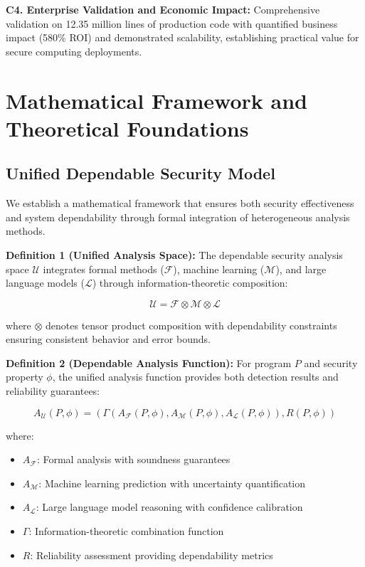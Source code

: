 \documentclass[10pt,journal,compsoc]{IEEEtran}
\begin{document}
\textbf{C4. Enterprise Validation and Economic Impact:} Comprehensive validation on 12.35 million lines of production code with quantified business impact (580\% ROI) and demonstrated scalability, establishing practical value for secure computing deployments.

\section{Mathematical Framework and Theoretical Foundations}

\subsection{Unified Dependable Security Model}

We establish a mathematical framework that ensures both security effectiveness and system dependability through formal integration of heterogeneous analysis methods.

\textbf{Definition 1 (Unified Analysis Space):} The dependable security analysis space $\mathcal{U}$ integrates formal methods ($\mathcal{F}$), machine learning ($\mathcal{M}$), and large language models ($\mathcal{L}$) through information-theoretic composition:

\begin{equation}
\mathcal{U} = \mathcal{F} \otimes \mathcal{M} \otimes \mathcal{L}
\end{equation}

where $\otimes$ denotes tensor product composition with dependability constraints ensuring consistent behavior and error bounds.

\textbf{Definition 2 (Dependable Analysis Function):} For program $P$ and security property $\phi$, the unified analysis function provides both detection results and reliability guarantees:

\begin{equation}
A_{\mathcal{U}}(P, \phi) = (\Gamma(A_{\mathcal{F}}(P, \phi), A_{\mathcal{M}}(P, \phi), A_{\mathcal{L}}(P, \phi)), R(P, \phi))
\end{equation}

where:
\begin{itemize}
\item $A_{\mathcal{F}}$: Formal analysis with soundness guarantees
\item $A_{\mathcal{M}}$: Machine learning prediction with uncertainty quantification
\item $A_{\mathcal{L}}$: Large language model reasoning with confidence calibration
\item $\Gamma$: Information-theoretic combination function
\item $R$: Reliability assessment providing dependability metrics
\end{itemize}
\end{document}
